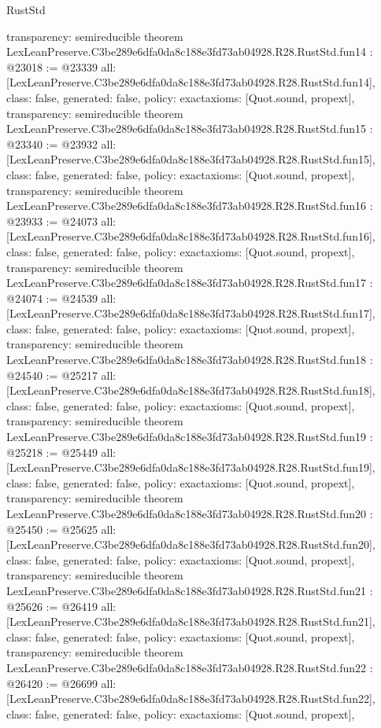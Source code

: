 \begin{lexlean}{RustStd}
\begin{coremodule}
{  transparency: semireducible
}
theorem LexLeanPreserve.C3be289e6dfa0da8c188e3fd73ab04928.R28.RustStd.fun14 : @23018 := @23339 {
  all: [LexLeanPreserve.C3be289e6dfa0da8c188e3fd73ab04928.R28.RustStd.fun14],
  class: false,
  generated: false,
  policy: exact{axioms: [Quot.sound, propext]},
  transparency: semireducible
}
theorem LexLeanPreserve.C3be289e6dfa0da8c188e3fd73ab04928.R28.RustStd.fun15 : @23340 := @23932 {
  all: [LexLeanPreserve.C3be289e6dfa0da8c188e3fd73ab04928.R28.RustStd.fun15],
  class: false,
  generated: false,
  policy: exact{axioms: [Quot.sound, propext]},
  transparency: semireducible
}
theorem LexLeanPreserve.C3be289e6dfa0da8c188e3fd73ab04928.R28.RustStd.fun16 : @23933 := @24073 {
  all: [LexLeanPreserve.C3be289e6dfa0da8c188e3fd73ab04928.R28.RustStd.fun16],
  class: false,
  generated: false,
  policy: exact{axioms: [Quot.sound, propext]},
  transparency: semireducible
}
theorem LexLeanPreserve.C3be289e6dfa0da8c188e3fd73ab04928.R28.RustStd.fun17 : @24074 := @24539 {
  all: [LexLeanPreserve.C3be289e6dfa0da8c188e3fd73ab04928.R28.RustStd.fun17],
  class: false,
  generated: false,
  policy: exact{axioms: [Quot.sound, propext]},
  transparency: semireducible
}
theorem LexLeanPreserve.C3be289e6dfa0da8c188e3fd73ab04928.R28.RustStd.fun18 : @24540 := @25217 {
  all: [LexLeanPreserve.C3be289e6dfa0da8c188e3fd73ab04928.R28.RustStd.fun18],
  class: false,
  generated: false,
  policy: exact{axioms: [Quot.sound, propext]},
  transparency: semireducible
}
theorem LexLeanPreserve.C3be289e6dfa0da8c188e3fd73ab04928.R28.RustStd.fun19 : @25218 := @25449 {
  all: [LexLeanPreserve.C3be289e6dfa0da8c188e3fd73ab04928.R28.RustStd.fun19],
  class: false,
  generated: false,
  policy: exact{axioms: [Quot.sound, propext]},
  transparency: semireducible
}
theorem LexLeanPreserve.C3be289e6dfa0da8c188e3fd73ab04928.R28.RustStd.fun20 : @25450 := @25625 {
  all: [LexLeanPreserve.C3be289e6dfa0da8c188e3fd73ab04928.R28.RustStd.fun20],
  class: false,
  generated: false,
  policy: exact{axioms: [Quot.sound, propext]},
  transparency: semireducible
}
theorem LexLeanPreserve.C3be289e6dfa0da8c188e3fd73ab04928.R28.RustStd.fun21 : @25626 := @26419 {
  all: [LexLeanPreserve.C3be289e6dfa0da8c188e3fd73ab04928.R28.RustStd.fun21],
  class: false,
  generated: false,
  policy: exact{axioms: [Quot.sound, propext]},
  transparency: semireducible
}
theorem LexLeanPreserve.C3be289e6dfa0da8c188e3fd73ab04928.R28.RustStd.fun22 : @26420 := @26699 {
  all: [LexLeanPreserve.C3be289e6dfa0da8c188e3fd73ab04928.R28.RustStd.fun22],
  class: false,
  generated: false,
  policy: exact{axioms: [Quot.sound, propext]},
}
\end{coremodule}
\end{lexlean}
